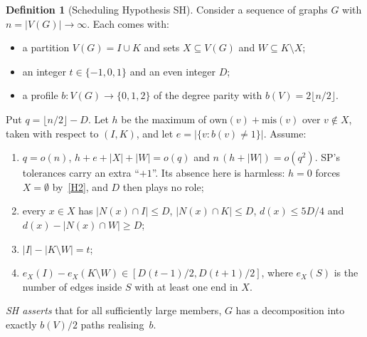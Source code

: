 \documentclass[11pt]{article}
\theoremstyle{definition}
\newtheorem{definition}[theorem]{Definition}
\newcommand{\own}{\mathrm{own}}
\newcommand{\mis}{\mathrm{mis}}
\begin{document}
\begin{definition}[Scheduling Hypothesis SH]\label{def:SH}
Consider a sequence of graphs $G$ with $n=|V(G)|\to\infty$. Each comes with:
\begin{itemize}[nosep]
\item a partition $V(G)=I\cup K$ and sets $X\subseteq V(G)$ and $W\subseteq K\setminus X$;
\item an integer $t\in\{-1,0,1\}$ and an even integer $D$;
\item a profile $b:V(G)\to\{0,1,2\}$ of the degree parity with $b(V)=2\lfloor n/2\rfloor$.
\end{itemize}
Put $q=\lfloor n/2\rfloor-D$. Let $h$ be the maximum of $\own(v)+\mis(v)$ over $v\notin X$, taken with respect to $(I,K)$, and let $e=|\{v:b(v)\ne1\}|$. Assume:
\begin{enumerate}[label=(H\arabic*),nosep]
\item\label{H1} $q=o(n)$, $h+e+|X|+|W|=o(q)$ and $n\,(h+|W|)=o(q^2)$. SP's tolerances carry an extra ``$+1$''. Its absence here is harmless: $h=0$ forces $X=\emptyset$ by~\ref{H2}, and $D$ then plays no role;
\item\label{H2} every $x\in X$ has $|N(x)\cap I|\le D$, $|N(x)\cap K|\le D$, $d(x)\le5D/4$ and $d(x)-|N(x)\cap W|\ge D$;
\item\label{H3} $|I|-|K\setminus W|=t$;
\item\label{H4} $e_X(I)-e_X(K\setminus W)\in[D(t-1)/2,D(t+1)/2]$, where $e_X(S)$ is the number of edges inside $S$ with at least one end in $X$.
\end{enumerate}
\emph{SH asserts} that for all sufficiently large members, $G$ has a decomposition into exactly $b(V)/2$ paths realising~$b$.
\end{definition}
\end{document}
